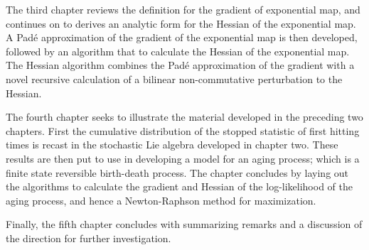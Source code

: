 The third chapter reviews the definition for the gradient of exponential map, and  continues
on to derives an analytic form for the Hessian of the exponential map. A Pad\'{e}
approximation of the gradient of the exponential map is then developed, followed by an
algorithm that to calculate the Hessian of the exponential map. The Hessian algorithm 
combines the Pad\'{e} approximation of the gradient with a novel recursive calculation of a
bilinear non-commutative perturbation to the Hessian.

The fourth chapter seeks to illustrate the material developed in the preceding two chapters.
First the cumulative distribution of the stopped statistic of first hitting times is recast 
in the stochastic Lie algebra developed in chapter two. These results are then put to use in
developing a model for an aging process; which is a finite state reversible birth-death
process. The chapter concludes by laying out the algorithms to calculate the gradient and
Hessian of the log-likelihood of the aging process, and hence a Newton-Raphson method for
maximization.

Finally, the fifth chapter concludes with summarizing remarks and a discussion of the
direction for further investigation.